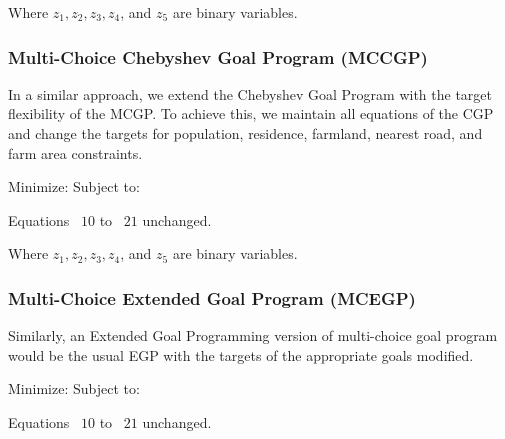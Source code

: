 Where $ z_1, z_2, z_3, z_4$, and $z_5$ are binary variables.

\subsubsection{Multi-Choice Chebyshev Goal Program (MCCGP)}
In a similar approach, we extend the Chebyshev Goal Program with the target flexibility of the \gls{MCGP}. To achieve this, we maintain all equations of the CGP and change the targets for population, residence, farmland, nearest road, and farm area constraints.

Minimize:
              \EqCGPMinFunctionSix
Subject to:
                
              \EqMCWGPPopulationConstraintFourtyTwo   
              \EqMCWGPResidenceConstraintFourtyThree
              \EqMCWGPFarmlandDistanceConstraintFourtyFour
              \EqMCWGPNearestRoadConstraintFourtyFive
              \EqMCWGPFarmlandAreaConstraintFourtySix
              \begin{center}
                      Equations ~$10$ to ~$21$ unchanged.
              \end{center}
              \EqSelectThreeDamsTwentyTwo
              \EqBudgetConstraintTwentyThree
              \EqDConstraintOneNTwentyFour
              \EqDConstraintTwoNTwentyFive
              \EqDConstraintThreeNTwentySix
              \EqDConstraintFourNTwentySix
              \EqDConstraintFiveNTwentySeven
              \EqDConstraintSixNTwentyEight
              \EqDConstraintSevenNTwentyNine
              \EqDConstraintEightNThirty
              \EqDConstraintNineNThirtyOne
              \EqDConstraintTenNThirtyTwo

Where $ z_1, z_2, z_3, z_4$, and $z_5$ are binary variables.

\subsubsection{Multi-Choice Extended Goal Program (MCEGP)}
Similarly, an Extended Goal Programming version of multi-choice goal program would be the usual EGP with the targets of the appropriate goals modified.

Minimize:
              \EqEGPObjectiveThirtyThree
Subject to:
              \EqMCWGPPopulationConstraintFourtyTwo   
              \EqMCWGPResidenceConstraintFourtyThree
              \EqMCWGPFarmlandDistanceConstraintFourtyFour
              \EqMCWGPNearestRoadConstraintFourtyFive
              \EqMCWGPFarmlandAreaConstraintFourtySix
              \begin{center}
                      Equations ~$10$ to ~$21$ unchanged.
              \end{center}
              \EqSelectThreeDamsTwentyTwo
              \EqBudgetConstraintTwentyThree
              \EqDConstraintOneNTwentyFour
              \EqDConstraintTwoNTwentyFive
              \EqDConstraintThreeNTwentySix
              \EqDConstraintFourNTwentySix
              \EqDConstraintFiveNTwentySeven
              \EqDConstraintSixNTwentyEight
              \EqDConstraintSevenNTwentyNine
              \EqDConstraintEightNThirty
              \EqDConstraintNineNThirtyOne
              \EqDConstraintTenNThirtyTwo

